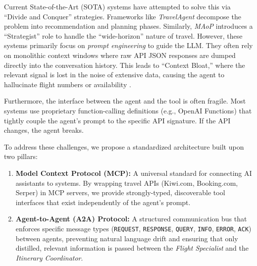 \documentclass[10pt,twocolumn]{article}
\begin{document}
Current State-of-the-Art (SOTA) systems have attempted to solve this via ``Divide and Conquer'' strategies. Frameworks like \textit{TravelAgent} \cite{chen2024travelagent} decompose the problem into recommendation and planning phases. Similarly, \textit{MAoP} \cite{yang2025planyourtravel} introduces a ``Strategist'' role to handle the ``wide-horizon'' nature of travel. However, these systems primarily focus on \textit{prompt engineering} to guide the LLM. They often rely on monolithic context windows where raw API JSON responses are dumped directly into the conversation history. This leads to ``Context Bloat,'' where the relevant signal is lost in the noise of extensive data, causing the agent to hallucinate flight numbers or availability \cite{shen2025triptailor}.

Furthermore, the interface between the agent and the tool is often fragile. Most systems use proprietary function-calling definitions (e.g., OpenAI Functions) that tightly couple the agent's prompt to the specific API signature. If the API changes, the agent breaks.

To address these challenges, we propose a standardized architecture built upon two pillars:
\begin{enumerate}
    \item \textbf{Model Context Protocol (MCP):} A universal standard for connecting AI assistants to systems. By wrapping travel APIs (Kiwi.com, Booking.com, Serper) in MCP servers, we provide strongly-typed, discoverable tool interfaces that exist independently of the agent's prompt.
    \item \textbf{Agent-to-Agent (A2A) Protocol:} A structured communication bus that enforces specific message types (\texttt{REQUEST}, \texttt{RESPONSE}, \texttt{QUERY}, \texttt{INFO}, \texttt{ERROR}, \texttt{ACK}) between agents, preventing natural language drift and ensuring that only distilled, relevant information is passed between the \textit{Flight Specialist} and the \textit{Itinerary Coordinator}.
\end{enumerate}
\end{document}

